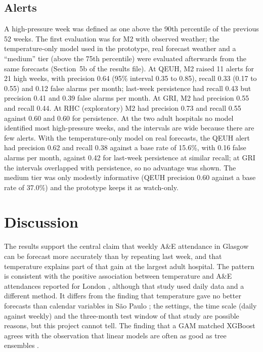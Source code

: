 \subsection{Alerts}
A high-pressure week was defined as one above the 90th percentile of the previous 52 weeks. The first evaluation was for M2 with observed weather; the temperature-only model used in the prototype, real forecast weather and a ``medium'' tier (above the 75th percentile) were evaluated afterwards from the same forecasts (Section~5b of the results file). At QEUH, M2 raised 11 alerts for 21 high weeks, with precision 0.64 (95\% interval 0.35 to 0.85), recall 0.33 (0.17 to 0.55) and 0.12 false alarms per month; last-week persistence had recall 0.43 but precision 0.41 and 0.39 false alarms per month. At GRI, M2 had precision 0.55 and recall 0.44. At RHC (exploratory) M2 had precision 0.73 and recall 0.55 against 0.60 and 0.60 for persistence. At the two adult hospitals no model identified most high-pressure weeks, and the intervals are wide because there are few alerts. With the temperature-only model on real forecasts, the QEUH alert had precision 0.62 and recall 0.38 against a base rate of 15.6\%, with 0.16 false alarms per month, against 0.42 for last-week persistence at similar recall; at GRI the intervals overlapped with persistence, so no advantage was shown. The medium tier was only modestly informative (QEUH precision 0.60 against a base rate of 37.0\%) and the prototype keeps it as watch-only.

\section{Discussion}
The results support the central claim that weekly A\&E attendance in Glasgow can be forecast more accurately than by repeating last week, and that temperature explains part of that gain at the largest adult hospital. The pattern is consistent with the positive association between temperature and A\&E attendances reported for London \parencite{corcuerahotz2020}, although that study used daily data and a different method. It differs from the finding that temperature gave no better forecasts than calendar variables in S\~ao Paulo \parencite{marcilio2013}; the settings, the time scale (daily against weekly) and the three-month test window of that study are possible reasons, but this project cannot tell. The finding that a GAM matched XGBoost agrees with the observation that linear models are often as good as tree ensembles \parencite{vollmer2021}.

